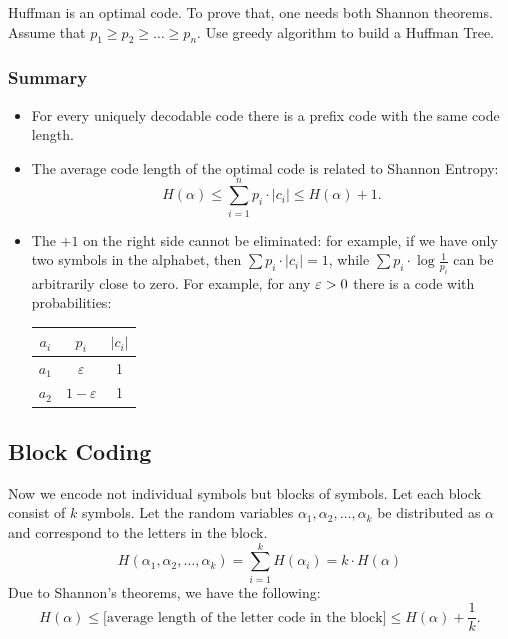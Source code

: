 \begin{example}
    Huffman is an optimal code.
    To prove that, one needs both Shannon theorems.
    Assume that $p_{1} \ge p_{2} \ge \dots \ge p_{n}$.
    Use greedy algorithm to build a Huffman Tree.
\end{example}

\subsubsection{Summary}

\begin{itemize}
    \item For every uniquely decodable code there is a prefix code with the same code length.
    \item The average code length of the optimal code is related to Shannon Entropy:
    \[
        H(\alpha) \le \sum _{ i = 1 }^{ n } p_{i} \cdot |c_{i}| \le H(\alpha) + 1.
    \]
    \item The $+1$ on the right side cannot be eliminated: for example, if we have only two symbols in the alphabet, then $\sum p_{i} \cdot |c_{i}| = 1$, while $\sum p_{i} \cdot \log \frac{1}{p_{i}}$ can be arbitrarily close to zero.
    For example, for any $\varepsilon > 0$ there is a code with probabilities:

    \begin{center}
    \begin{tabular}{|c|c|c|}
        \hline
        $a_{i}$ & $p_{i}$ & $|c_{i}|$ \\
        \hline
        $a_{1}$ & $\varepsilon$ & 1 \\
        $a_{2}$ & $1 - \varepsilon$ & 1 \\
        \hline
    \end{tabular}
    \end{center}
\end{itemize}

\subsection{Block Coding}

Now we encode not individual symbols but blocks of symbols.
Let each block consist of $k$ symbols.
Let the random variables $\alpha_{1}, \alpha_{2}, \dots, \alpha_{k}$ be distributed as $\alpha$ and correspond to the letters in the block.
\[
H(\alpha_{1}, \alpha_{2}, \dots, \alpha_{k}) = \sum_{i = 1}^{k} H(\alpha_{i}) = k \cdot H(\alpha)
\]
Due to Shannon's theorems, we have the following:
\[
H(\alpha) \le \text{[average length of the letter code in the block]} \le H(\alpha) + \frac{1}{k}.
\]

